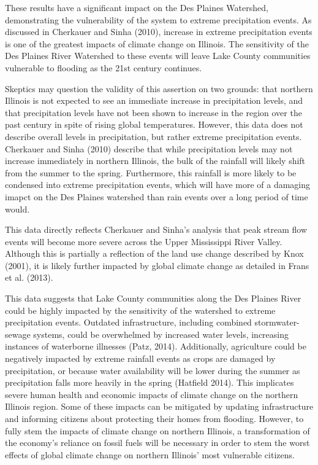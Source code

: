 \documentclass{article}\usepackage[]{graphicx}\usepackage[]{color}
\begin{document}
These results have a significant impact on the Des Plaines Watershed, demonstrating the vulnerability of the system to extreme precipitation events.  As discussed in Cherkauer and Sinha (2010), increase in extreme precipitation events is one of the greatest impacts of climate change on Illinois.  The sensitivity of the Des Plaines River Watershed to these events will leave Lake County communities vulnerable to flooding as the 21st century continues.

Skeptics may question the validity of this assertion on two grounds: that northern Illinois is not expected to see an immediate increase in precipitation levels, and that precipitation levels have not been shown to increase in the region over the past century in spite of rising global temperatures.  However, this data does not describe overall levels in precipitation, but rather extreme precipitation events. Cherkauer and Sinha (2010) describe that while precipitation levels may not increase immediately in northern Illinois, the bulk of the rainfall will likely shift from the summer to the spring.  Furthermore, this rainfall is more likely to be condensed into extreme precipitation events, which will have more of a damaging imapct on the Des Plaines watershed than rain events over a long period of time would.  

This data directly reflects Cherkauer and Sinha's analysis that peak stream flow events will become more severe across the Upper Mississippi River Valley.  Although this is partially a reflection of the land use change described by Knox (2001), it is likely further impacted by global climate change as detailed in Frans et al. (2013).  

This data suggests that Lake County communities along the Des Plaines River could be highly impacted by the sensitivity of the watershed to extreme precipitation events.  Outdated infrastructure, including combined stormwater-sewage systems, could be overwhelmed by increased water levels, increasing instances of waterborne illnesses (Patz, 2014).  Additionally, agriculture could be negatively impacted by extreme rainfall events as crops are damaged by precipitation, or because water availability will be lower during the summer as precipitation falls more heavily in the spring (Hatfield 2014).  This implicates severe human health and economic impacts of climate change on the northern Illinois region.  Some of these impacts can be mitigated by updating infrastructure and informing citizens about protecting their homes from flooding.  However, to fully stem the impacts of climate change on northern Illinois, a transformation of the economy's reliance on fossil fuels will be necessary in order to stem the worst effects of global climate change on northern Illinois' most vulnerable citizens.
\end{document}
